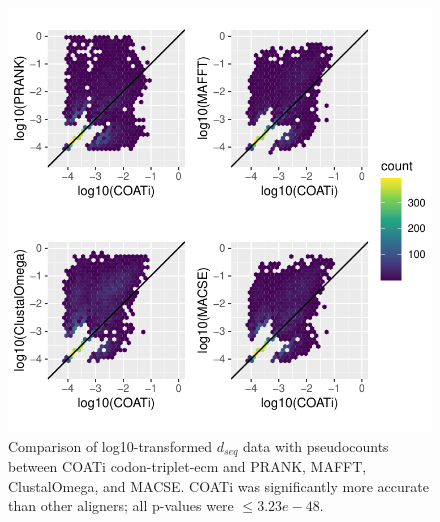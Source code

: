 \documentclass[
]{article}
\begin{document}
\begin{figure}

{\centering \includegraphics{figures/dseq_plots_tri-ecm} 

}

\caption{\label{fig:dseq-tri-ecm} Comparison of log10-transformed $d_{seq}$ data with pseudocounts between COATi codon-triplet-ecm and PRANK, MAFFT, ClustalOmega, and MACSE. COATi was significantly more accurate than other aligners; all p-values were $\leq 3.23e-48$.}\label{fig:dseq2}
\end{figure}
\end{document}
